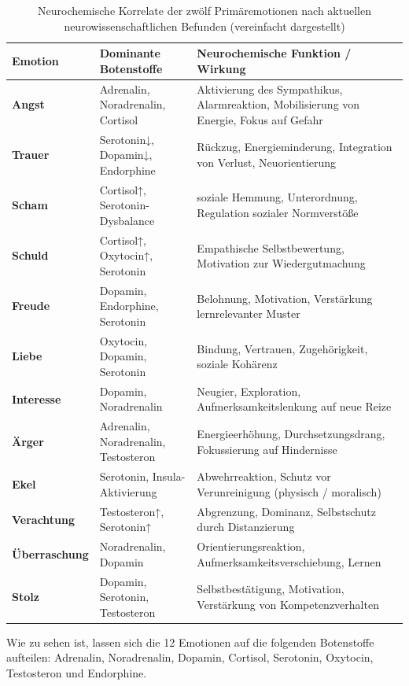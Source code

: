 \begin{table}[H]
\renewcommand{\arraystretch}{1.5}
\centering
\begin{tabular}{L{3cm}|L{6cm}|L{6cm}}
\textbf{Emotion} & \textbf{Dominante Botenstoffe} & \textbf{Neurochemische Funktion / Wirkung} \\
\hline
\textbf{Angst} & Adrenalin, Noradrenalin, Cortisol & Aktivierung des Sympathikus, Alarmreaktion, Mobilisierung von Energie, Fokus auf Gefahr \\
\textbf{Trauer} & Serotonin↓, Dopamin↓, Endorphine & Rückzug, Energieminderung, Integration von Verlust, Neuorientierung \\
\textbf{Scham} & Cortisol↑, Serotonin-Dysbalance & soziale Hemmung, Unterordnung, Regulation sozialer Normverstöße \\
\textbf{Schuld} & Cortisol↑, Oxytocin↑, Serotonin & Empathische Selbstbewertung, Motivation zur Wiedergutmachung \\
\textbf{Freude} & Dopamin, Endorphine, Serotonin & Belohnung, Motivation, Verstärkung lernrelevanter Muster \\
\textbf{Liebe} & Oxytocin, Dopamin, Serotonin & Bindung, Vertrauen, Zugehörigkeit, soziale Kohärenz \\
\textbf{Interesse} & Dopamin, Noradrenalin & Neugier, Exploration, Aufmerksamkeitslenkung auf neue Reize \\
\textbf{Ärger} & Adrenalin, Noradrenalin, Testosteron & Energieerhöhung, Durchsetzungsdrang, Fokussierung auf Hindernisse \\
\textbf{Ekel} & Serotonin, Insula-Aktivierung & Abwehrreaktion, Schutz vor Verunreinigung (physisch / moralisch) \\
\textbf{Verachtung} & Testosteron↑, Serotonin↑ & Abgrenzung, Dominanz, Selbstschutz durch Distanzierung \\
\textbf{Überraschung} & Noradrenalin, Dopamin & Orientierungsreaktion, Aufmerksamkeitsverschiebung, Lernen \\
\textbf{Stolz} & Dopamin, Serotonin, Testosteron & Selbstbestätigung, Motivation, Verstärkung von Kompetenzverhalten \\
\end{tabular}
\caption{Neurochemische Korrelate der zwölf Primäremotionen nach aktuellen neurowissenschaftlichen Befunden (vereinfacht dargestellt)}
\label{tab:neurochemie_primäremotionen}
\end{table}

Wie zu sehen ist, lassen sich die 12 Emotionen auf die folgenden Botenstoffe aufteilen: Adrenalin, Noradrenalin, Dopamin, Cortisol, Serotonin, Oxytocin, Testosteron und Endorphine.

